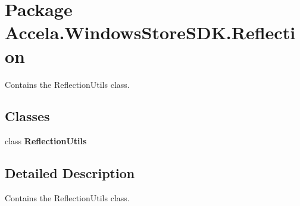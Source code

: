\hypertarget{namespace_accela_1_1_windows_store_s_d_k_1_1_reflection}{\section{Package Accela.\+Windows\+Store\+S\+D\+K.\+Reflection}
\label{namespace_accela_1_1_windows_store_s_d_k_1_1_reflection}
}


Contains the Reflection\+Utils class.  


\subsection*{Classes}
\begin{DoxyCompactItemize}
\item 
class {\bfseries Reflection\+Utils}
\end{DoxyCompactItemize}


\subsection{Detailed Description}
Contains the Reflection\+Utils class. 

